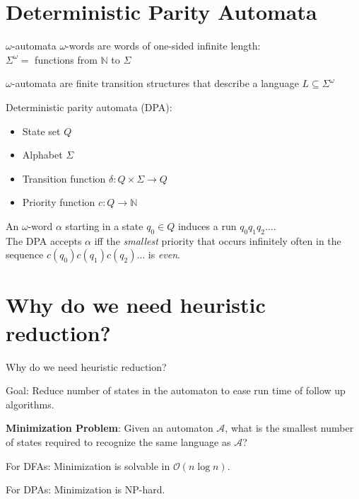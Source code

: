 
\section{Deterministic Parity Automata}
\begin{frame}{$\omega$-automata}
$\omega$-words are words of one-sided infinite length: \\
$\Sigma^\omega = $ functions from $\mathbb{N}$ to $\Sigma$

\vspace{.5cm}

$\omega$-automata are finite transition structures that describe a language $L \subseteq \Sigma^\omega$ 

\vspace{.5cm}

Deterministic parity automata (DPA):
\begin{itemize}
	\item State set $Q$
	\item Alphabet $\Sigma$
	\item Transition function $\delta : Q \times \Sigma \rightarrow Q$
	\item Priority function $c : Q \rightarrow \mathbb{N}$
\end{itemize}

An $\omega$-word $\alpha$ starting in a state $q_0 \in Q$ induces a run $q_0 q_1 q_2 \dots$. \\
The DPA accepts $\alpha$ iff the \emph{smallest} priority that occurs infinitely often in the sequence $c(q_0) c(q_1) c(q_2) \dots$ is \emph{even}.

\end{frame}


\section{Why do we need heuristic reduction?}
\begin{frame}{Why do we need heuristic reduction?}

Goal: Reduce number of states in the automaton to ease run time of follow up algorithms.

\vspace{.7cm}

\textbf{Minimization Problem}: Given an automaton $\mathcal{A}$, what is the smallest number of states required to recognize the same language as $\mathcal{A}$?

\vspace{.7cm}

For DFAs: Minimization is solvable in $\mathcal{O}(n \log n)$. \cite{Hopcroft1971}

For DPAs: Minimization is NP-hard. \cite{Schewe2010}

\end{frame}


